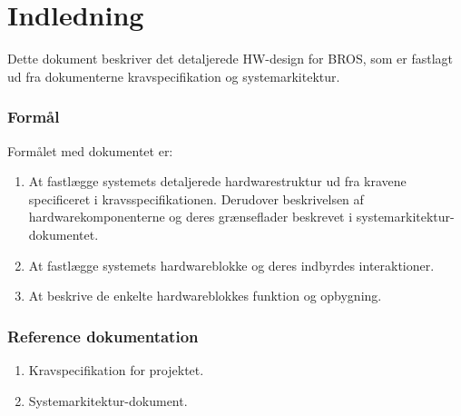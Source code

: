 \chapter{Indledning}
Dette dokument beskriver det detaljerede HW-design for BROS, som er fastlagt ud fra dokumenterne kravspecifikation og systemarkitektur.
\subsection{Formål}
Formålet med dokumentet er:\\
\begin{enumerate}[$\bullet$]
\item At fastlægge systemets detaljerede hardwarestruktur ud fra kravene specificeret i kravsspecifikationen. Derudover beskrivelsen af hardwarekomponenterne og deres grænseflader beskrevet i systemarkitektur-dokumentet.
\item At fastlægge systemets hardwareblokke og deres indbyrdes interaktioner.
\item At beskrive de enkelte hardwareblokkes funktion og opbygning.
\end{enumerate}
\subsection{Reference dokumentation}
\begin{enumerate}[$\bullet$]
\item Kravspecifikation for projektet.
\item Systemarkitektur-dokument.
\end{enumerate}
